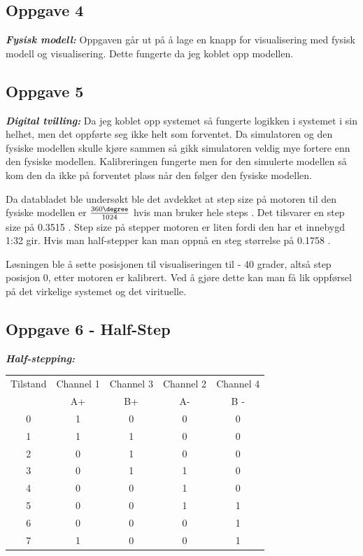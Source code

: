 \subsection{Oppgave 4}
\textbf{\textit{Fysisk modell:}}
\newline
Oppgaven går ut på å lage en knapp for visualisering med fysisk modell og visualisering. Dette fungerte da jeg koblet opp modellen. 

\subsection{Oppgave 5}
\textbf{\textit{Digital tvilling:}}
\newline
Da jeg koblet opp systemet så fungerte logikken i systemet i sin helhet, men det oppførte seg ikke helt som forventet. Da simulatoren og den fysiske modellen skulle kjøre sammen så gikk simulatoren veldig mye fortere enn den fysiske modellen. Kalibreringen fungerte men for den simulerte modellen så kom den da ikke på forventet plass når den følger den fysiske modellen.

Da databladet ble undersøkt ble det avdekket at step size på motoren til den fysiske modellen er $\frac{360 \degree}{1024}$ hvis man bruker hele steps \cite{Stepper-motor-datasheet}. Det tilsvarer en step size på 0.3515 \degree. Step size på stepper motoren er liten fordi den har et innebygd 1:32 gir. Hvis man half-stepper kan man oppnå en steg størrelse på 0.1758 \degree.

Løsningen ble å sette posisjonen til visualiseringen til - 40 grader, altså step posisjon 0, etter motoren er kalibrert. Ved å gjøre dette kan man få lik oppførsel på det virkelige systemet og det virituelle.

\subsection{Oppgave 6 - Half-Step}
\textbf{\textit{Half-stepping:}}
\newline
\begin{center}
\begin{tabular}{ |c|c|c|c|c|}
\hline
Tilstand & Channel 1 & Channel 3 & Channel 2 & Channel 4 \\
 & A+ & B+ & A- & B - \\
\hline
0 & 1 & 0 & 0 & 0 \\ 
\hline
1 & 1 & 1 & 0 & 0 \\ 
\hline
2 & 0 & 1 & 0 & 0 \\ 
\hline
3 & 0 & 1 & 1 & 0 \\ 
\hline
4 & 0 & 0 & 1 & 0 \\ 
\hline
5 & 0 & 0 & 1 & 1 \\ 
\hline
6 & 0 & 0 & 0 & 1 \\ 
\hline
7 & 1 & 0 & 0 & 1 \\ 
 \hline
\end{tabular}
\label{tab:Halfstep}
\end{center}

